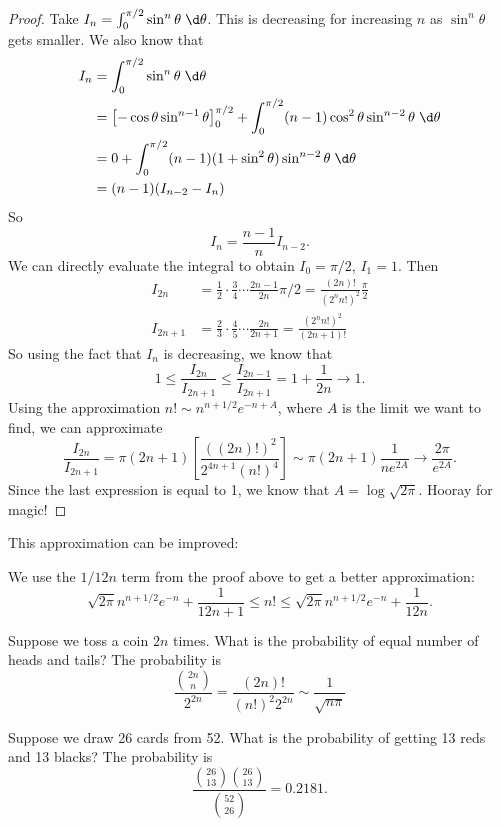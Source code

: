 \documentclass[a4paper]{article}
\begin{document}
\begin{proof}
  Take $I_n = \int_0^{\pi/2} \sin^n\theta\;\d \theta$. This is decreasing for increasing $n$ as $\sin^n\theta$ gets smaller. We also know that
  \begin{align*}
    I_n &= \int_0^{\pi/2}\sin^n \theta\;\d \theta\\
    &= \left[-\cos\theta\sin^{n - 1}\theta \right]_0^{\pi/2} + \int_0^{\pi/2} (n - 1)\cos^2\theta \sin^{n - 2}\theta \;\d\theta\\
    &= 0 + \int_0^{\pi/2}(n - 1)(1 + \sin^2 \theta)\sin^{n - 2}\theta \;\d \theta\\
    &= (n - 1)(I_{n - 2} - I_n)
  \end{align*}
  So
  \[
    I_n = \frac{n - 1}{n}I_{n - 2}.
  \]
  We can directly evaluate the integral to obtain $I_0 = \pi/2$, $I_1 = 1$. Then
  \begin{align*}
    I_{2n} &= \frac{1}{2}\cdot\frac{3}{4}\cdots \frac{2n - 1}{2n} \pi/2 = \frac{(2n)!}{(2^nn!)^2}\frac{\pi}{2}\\
    I_{2n + 1} &= \frac{2}{3}\cdot\frac{4}{5}\cdots\frac{2n}{2n + 1} = \frac{(2^nn!)^2}{(2n + 1)!}
  \end{align*}
  So using the fact that $I_n$ is decreasing, we know that
  \[
    1 \leq \frac{I_{2n}}{I_{2n + 1}} \leq \frac{I_{2n - 1}}{I_{2n + 1}} = 1 + \frac{1}{2n} \to 1.
  \]
  Using the approximation $n!\sim n^{n + 1/2}e^{-n + A}$, where $A$ is the limit we want to find, we can approximate
  \[
    \frac{I_{2n}}{I_{2n + 1}} = \pi(2n + 1)\left[\frac{( (2n)!)^2}{2^{4n + 1}(n!)^4}\right] \sim \pi(2n + 1)\frac{1}{ne^{2A}}\to \frac{2\pi}{e^{2A}}.
  \]
  Since the last expression is equal to 1, we know that $A = \log\sqrt{2\pi}$. Hooray for magic!
\end{proof}

This approximation can be improved:
\begin{prop}
  We use the $1/12n$ term from the proof above to get a better approximation:
  \[
    \sqrt{2\pi}n^{n + 1/2}e^{-n} + \frac{1}{12n + 1} \leq n! \leq \sqrt{2\pi} n^{n + 1/2} e^{-n} + \frac{1}{12n}.
  \]
\end{prop}

\begin{eg}
  Suppose we toss a coin $2n$ times. What is the probability of equal number of heads and tails? The probability is
  \[
    \frac{\binom{2n}{n}}{2^{2n}} = \frac{(2n)!}{(n!)^2 2^{2n}} \sim \frac{1}{\sqrt{n\pi}}
  \]
\end{eg}

\begin{eg}
  Suppose we draw 26 cards from 52. What is the probability of getting 13 reds and 13 blacks? The probability is
  \[
    \frac{\binom{26}{13}\binom{26}{13}}{\binom{52}{26}} = 0.2181.
  \]
\end{eg}
\end{document}

